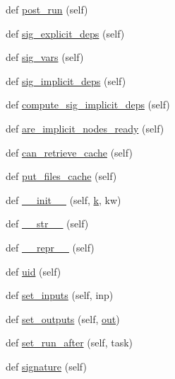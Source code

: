 \begin{DoxyCompactItemize}
\item 
def \hyperlink{classwaflib_1_1_task_1_1_task_ac7c2e0bf22acd7d96399b1ca7f342232}{post\+\_\+run} (self)
\item 
def \hyperlink{classwaflib_1_1_task_1_1_task_a76a53025fb59fd6096f988ff64481070}{sig\+\_\+explicit\+\_\+deps} (self)
\item 
def \hyperlink{classwaflib_1_1_task_1_1_task_acffd01af005b390787b85239ac207282}{sig\+\_\+vars} (self)
\item 
def \hyperlink{classwaflib_1_1_task_1_1_task_a60ce159ef323481b09fcea4decb9e231}{sig\+\_\+implicit\+\_\+deps} (self)
\item 
def \hyperlink{classwaflib_1_1_task_1_1_task_adf3f63ea77fbca592ebc4244ba57887d}{compute\+\_\+sig\+\_\+implicit\+\_\+deps} (self)
\item 
def \hyperlink{classwaflib_1_1_task_1_1_task_a89612661d2073f53f62d7306a6c2238d}{are\+\_\+implicit\+\_\+nodes\+\_\+ready} (self)
\item 
def \hyperlink{classwaflib_1_1_task_1_1_task_a2085cfed25d49bed519af381621b29e7}{can\+\_\+retrieve\+\_\+cache} (self)
\item 
def \hyperlink{classwaflib_1_1_task_1_1_task_adf5e108580503738b2ab58eb1b56c10f}{put\+\_\+files\+\_\+cache} (self)
\item 
def \hyperlink{classwaflib_1_1_task_1_1_task_a566ab609bec4499aeab7bcd6f77f156e}{\+\_\+\+\_\+init\+\_\+\+\_\+} (self, \hyperlink{rfft2d_test_m_l_8m_adc468c70fb574ebd07287b38d0d0676d}{k}, kw)
\item 
def \hyperlink{classwaflib_1_1_task_1_1_task_a2507ae71718d699910a9dd8708664630}{\+\_\+\+\_\+str\+\_\+\+\_\+} (self)
\item 
def \hyperlink{classwaflib_1_1_task_1_1_task_ac05a045661750df307593224089759da}{\+\_\+\+\_\+repr\+\_\+\+\_\+} (self)
\item 
def \hyperlink{classwaflib_1_1_task_1_1_task_a910c51ea67c1c47ac40690bbba73b76a}{uid} (self)
\item 
def \hyperlink{classwaflib_1_1_task_1_1_task_a647c971bbca84d07daeff8d24f70ea18}{set\+\_\+inputs} (self, inp)
\item 
def \hyperlink{classwaflib_1_1_task_1_1_task_a8e650ed64c8370720574ebd8481a4f48}{set\+\_\+outputs} (self, \hyperlink{latency_8c_a71fd1c281affec034757279e4f91c50b}{out})
\item 
def \hyperlink{classwaflib_1_1_task_1_1_task_a84292828c5a6cf3282027ed8ce5c7822}{set\+\_\+run\+\_\+after} (self, task)
\item 
def \hyperlink{classwaflib_1_1_task_1_1_task_a48e55f13de8172b779a4e63794c7f44f}{signature} (self)

\end{DoxyCompactItemize}
